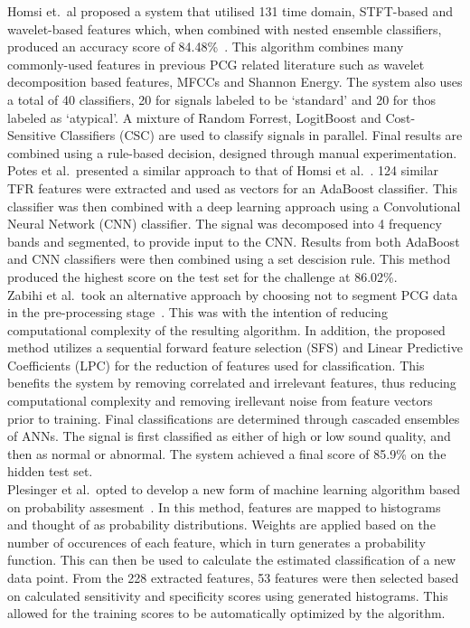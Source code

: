 \documentclass[titlepage, 12pt]{scrartcl} \usepackage{enumitem}
\begin{document}
Homsi et.\ al proposed a system that utilised 131 time domain, STFT-based and
wavelet-based features which, when combined with nested ensemble classifiers,
produced an accuracy score of 84.48\%~\parencite{Homsi2017}. This algorithm
combines many commonly-used features in previous PCG related literature such as
wavelet decomposition based features, MFCCs and Shannon Energy. The system also
uses a total of 40 classifiers, 20 for signals labeled to be `standard' and 20
for thos labeled as `atypical'. A mixture of Random Forrest, LogitBoost and
Cost-Sensitive Classifiers (CSC) are used to classify signals in parallel.
Final results are combined using a rule-based decision, designed through manual
experimentation.\\

Potes et al.\ presented a similar approach to that of Homsi et
al.~\parencite{Potes2016}. 124 similar TFR features were extracted and used as
vectors for an AdaBoost classifier. This classifier was then combined with a
deep learning approach using a Convolutional Neural Network (CNN) classifier.
The signal was decomposed into 4 frequency bands and segmented, to provide
input to the CNN. Results from both AdaBoost and CNN classifiers were then
combined using a set descision rule.  This method produced the highest score on
the test set for the challenge at 86.02\%.\\

Zabihi et al.\ took an alternative approach by choosing not to segment PCG data
in the pre-processing stage~\parencite{Zabihi2016}. This was with the intention
of reducing computational complexity of the resulting algorithm. In addition,
the proposed method utilizes a sequential forward feature selection (SFS) and
Linear Predictive Coefficients (LPC) for the reduction of features used for
classification. This benefits the system by removing correlated and irrelevant
features, thus reducing computational complexity and removing irellevant noise
from feature vectors prior to training.  Final classifications are determined
through cascaded ensembles of ANNs. The signal is first classified as either of
high or low sound quality, and then as normal or abnormal. The system achieved
a final score of 85.9\% on the hidden test set.\\

Plesinger et al.\ opted to develop a new form of machine learning algorithm
based on probability assesment~\parencite{Plesinger2017}. In this method,
features are mapped to histograms and thought of as probability distributions.
Weights are applied based on the number of occurences of each feature, which in
turn generates a probability function. This can then be used to calculate the
estimated classification of a new data point. From the 228 extracted features,
53 features were then selected based on calculated sensitivity and specificity
scores using generated histograms. This allowed for the training scores to be
automatically optimized by the algorithm.\\
\end{document}
